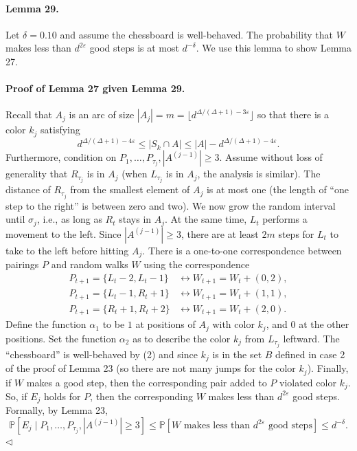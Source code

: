 \paragraph{Lemma 29.} Let $\delta=0.10$ and assume the chessboard is well-behaved. The probability that $W$ makes less than $d^{2\varepsilon}$ good steps is at most $d^{-\delta}$.
We use this lemma to show Lemma 27.
\paragraph{Proof of Lemma 27 given Lemma 29.} Recall that $A_j$ is an arc of size $|A_j|=m=\lfloor d^{\Delta/(\Delta+1)-3\varepsilon}\rfloor$ so that there is a color $k_j$ satisfying
\[d^{\Delta/(\Delta+1)-4\varepsilon}\leq|S_k\cap A|\leq|A|-d^{\Delta/(\Delta+1)-4\varepsilon}.\tag{2}\]
Furthermore, condition on $P_1,\ldots,P_{\tau_j},|A^{(j-1)}|\geq3$. Assume without loss of generality that $R_{\tau_j}$ is in $A_j$ (when $L_{\tau_j}$ is in $A_j$, the analysis is similar). The distance of $R_{\tau_j}$ from the smallest element of $A_j$ is at most one (the length of ``one step to the right'' is between zero and two). We now grow the random interval until $\sigma_j$, i.e., as long as $R_t$ stays in $A_j$. At the same time, $L_t$ performs a movement to the left. Since $|A^{(j-1)}|\geq3$, there are at least $2m$ steps for $L_t$ to take to the left before hitting $A_j$. There is a one-to-one correspondence between pairings $P$ and random walks $W$ using the correspondence
\begin{align*}
P_{t+1}=\{L_t-2,L_t-1\}&\longleftrightarrow W_{t+1}=W_t+(0,2),\\
P_{t+1}=\{L_t-1,R_t+1\}&\longleftrightarrow W_{t+1}=W_t+(1,1),\\
P_{t+1}=\{R_t+1,R_t+2\}&\longleftrightarrow W_{t+1}=W_t+(2,0).
\end{align*}
Define the function $\alpha_1$ to be $1$ at positions of $A_j$ with color $k_j$, and $0$ at the other positions. Set the function $\alpha_2$ as to describe the color $k_j$ from $L_{\tau_j}$ leftward. The ``chessboard'' is well-behaved by (2) and since $k_j$ is in the set $B$ defined in case 2 of the proof of Lemma 23 (so there are not many jumps for the color $k_j$). Finally, if $W$ makes a good step, then the corresponding pair added to $P$ violated color $k_j$. So, if $E_j$ holds for $P$, then the corresponding $W$ makes less than $d^{2\varepsilon}$ good steps. Formally, by Lemma 23,
\[\mathbb P[E_j\mid P_1,\ldots,P_{\tau_j},|A^{(j-1)}|\geq3]\leq\mathbb P[W\text{ makes less than }d^{2\varepsilon}\text{ good steps}]\leq d^{-\delta}.\]\hfill$\triangleleft$
